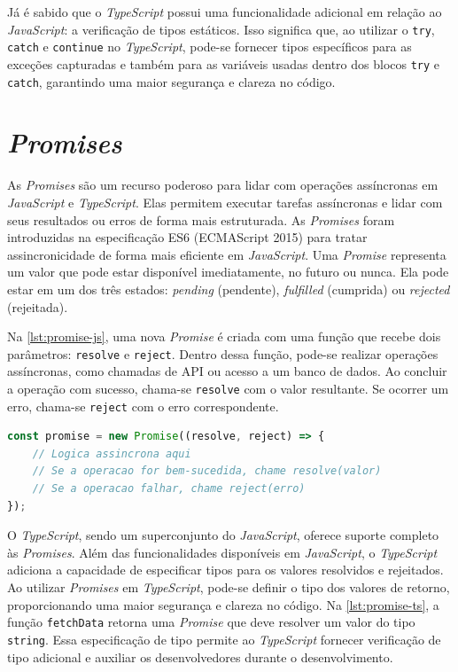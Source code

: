 Já é sabido que o \textit{TypeScript} possui uma funcionalidade adicional em relação ao \textit{JavaScript}: a verificação de tipos estáticos. Isso significa que, ao utilizar o \texttt{try}, \texttt{catch} e \texttt{continue} no \textit{TypeScript}, pode-se fornecer tipos específicos para as exceções capturadas e também para as variáveis usadas dentro dos blocos \texttt{try} e \texttt{catch}, garantindo uma maior segurança e clareza no código.



\section{\textit{Promises}}
\label{JS_promises}

As \textit{Promises} são um recurso poderoso para lidar com operações assíncronas em \textit{JavaScript} e \textit{TypeScript}. Elas permitem executar tarefas assíncronas e lidar com seus resultados ou erros de forma mais estruturada. As \textit{Promises} foram introduzidas na especificação ES6 (ECMAScript 2015) para tratar assincronicidade de forma mais eficiente em \textit{JavaScript}. Uma \textit{Promise} representa um valor que pode estar disponível imediatamente, no futuro ou nunca. Ela pode estar em um dos três estados: \textit{pending} (pendente), \textit{fulfilled} (cumprida) ou \textit{rejected} (rejeitada).

Na \autoref{lst:promise-js}, uma nova \textit{Promise} é criada com uma função que recebe dois parâmetros: \texttt{resolve} e \texttt{reject}. Dentro dessa função, pode-se realizar operações assíncronas, como chamadas de API ou acesso a um banco de dados. Ao concluir a operação com sucesso, chama-se \texttt{resolve} com o valor resultante. Se ocorrer um erro, chama-se \texttt{reject} com o erro correspondente.

\Needspace{0.3\textheight}
\begin{lstlisting}[language=TypeScript, caption={Criação de uma Promise em JavaScript}, label=lst:promise-js]
const promise = new Promise((resolve, reject) => {
    // Logica assincrona aqui
    // Se a operacao for bem-sucedida, chame resolve(valor)
    // Se a operacao falhar, chame reject(erro)
});
\end{lstlisting}


O \textit{TypeScript}, sendo um superconjunto do \textit{JavaScript}, oferece suporte completo às \textit{Promises}. Além das funcionalidades disponíveis em \textit{JavaScript}, o \textit{TypeScript} adiciona a capacidade de especificar tipos para os valores resolvidos e rejeitados. Ao utilizar \textit{Promises} em \textit{TypeScript}, pode-se definir o tipo dos valores de retorno, proporcionando uma maior segurança e clareza no código. Na \autoref{lst:promise-ts}, a função \texttt{fetchData} retorna uma \textit{Promise} que deve resolver um valor do tipo \texttt{string}. Essa especificação de tipo permite ao \textit{TypeScript} fornecer verificação de tipo adicional e auxiliar os desenvolvedores durante o desenvolvimento.
\Needspace{0.3\textheight}

